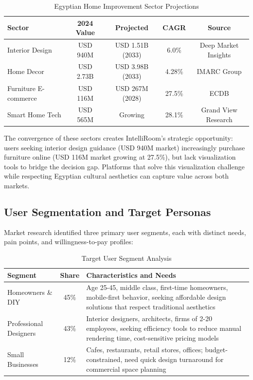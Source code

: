 \begin{table}[htbp]
\centering
\small
\caption{Egyptian Home Improvement Sector Projections}
\label{tab:market_sectors}
\begin{tabular}{lcccc}
\toprule
\textbf{Sector} & \textbf{2024 Value} & \textbf{Projected} & \textbf{CAGR} & \textbf{Source} \\
\midrule
Interior Design & USD 940M & USD 1.51B (2033) & 6.0\% & Deep Market Insights \\
Home Decor & USD 2.73B & USD 3.98B (2033) & 4.28\% & IMARC Group \\
Furniture E-commerce & USD 116M & USD 267M (2028) & 27.5\% & ECDB \\
Smart Home Tech & USD 565M & Growing & 28.1\% & Grand View Research \\
\bottomrule
\end{tabular}
\end{table}

The convergence of these sectors creates IntelliRoom's strategic opportunity: users seeking interior design guidance (USD 940M market) increasingly purchase furniture online (USD 116M market growing at 27.5\%), but lack visualization tools to bridge the decision gap. Platforms that solve this visualization challenge while respecting Egyptian cultural aesthetics can capture value across both markets.

\subsection{User Segmentation and Target Personas}

Market research identified three primary user segments, each with distinct needs, pain points, and willingness-to-pay profiles:

\begin{table}[htbp]
\centering
\caption{Target User Segment Analysis}
\label{tab:user_segments}
\begin{tabular}{p{3cm}cp{8cm}}
\toprule
\textbf{Segment} & \textbf{Share} & \textbf{Characteristics and Needs} \\
\midrule
Homeowners \& DIY & 45\% & Age 25-45, middle class, first-time homeowners, mobile-first behavior, seeking affordable design solutions that respect traditional aesthetics \\
Professional Designers & 43\% & Interior designers, architects, firms of 2-20 employees, seeking efficiency tools to reduce manual rendering time, cost-sensitive pricing models \\
Small Businesses & 12\% & Cafes, restaurants, retail stores, offices; budget-constrained, need quick design turnaround for commercial space planning \\
\bottomrule
\end{tabular}
\end{table}

